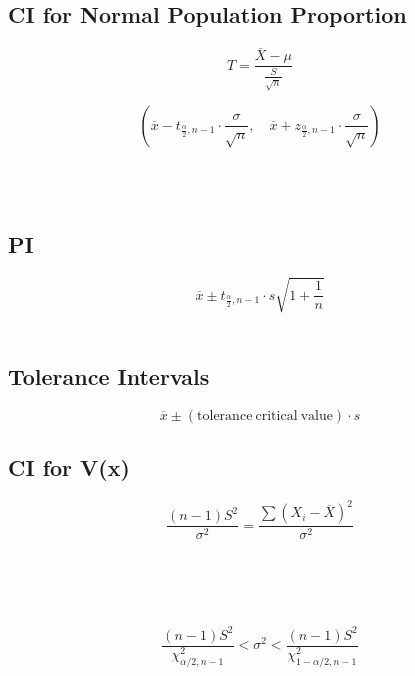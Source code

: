 \documentclass[UTF8]{ctexart}
\numberwithin{equation}{subsection}%
\begin{document}
	\subsection{ CI for Normal Population Proportion}
	\begin{Large}
		\begin{equation}
			T=\frac{\overline{X}-\mu}{\frac{S}{\sqrt{n}}}
		\end{equation}
	\end{Large}
	\begin{Large}
	\begin{equation}
		\left(\overline{x}-t_{\frac{\alpha}{2},n-1}\cdot\frac{\sigma}{\sqrt{n}},\quad \overline{x}+z_{\frac{\alpha}{2},n-1}\cdot\frac{\sigma}{\sqrt{n}}\right)
	\end{equation}		
	\end{Large}
~\\
~\\
	\subsection{ PI}
	\begin{Large}
		\begin{equation}
			\overline{x}\pm t_{\frac{\alpha}{2},n-1}\cdot s\sqrt{1+\frac{1}{n}}
		\end{equation}
	~\\		
	\end{Large}
	\subsection{ Tolerance Intervals}
	\begin{Large}
		\begin{equation}
			\overline{x}\pm \mathrm{(tolerance\  critical\ value)}\cdot s
		\end{equation}
	\end{Large}
	\subsection{ CI for V(x)}
	\begin{Large}
		\begin{equation}
		\frac{(n-1)S^2}{\sigma^2}=\frac{\sum(X_i-\overline{X})^2}{\sigma^2}
		\end{equation}
	\end{Large}
	~\\	
	~\\
	~\\
	\begin{Large}
	\begin{equation}
		\frac{(n-1)S^2}{\chi^2_{\alpha/2,n-1}}<\sigma^2<\frac{(n-1)S^2}{\chi^2_{1-\alpha/2,n-1}}
	\end{equation}
	\end{Large}
\end{document}
